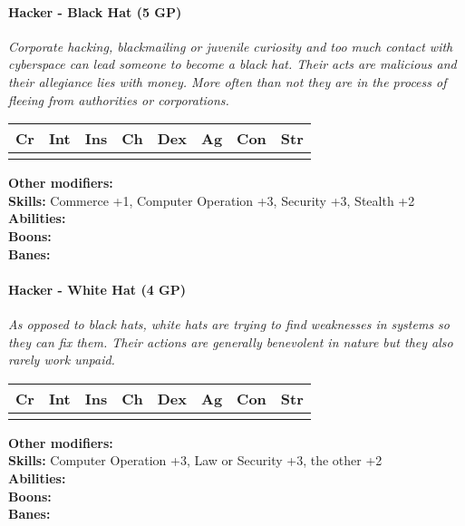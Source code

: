 \hrulefill
\paragraph*{Hacker - Black Hat (5 GP)}
\textit{Corporate hacking, blackmailing or juvenile curiosity and too much contact with cyberspace can lead someone to become a black hat. Their acts are malicious and their allegiance lies with money. More often than not they are in the process of fleeing from authorities or corporations.}\par
\begin{tabular}{|l|l|l|l|l|l|l|l|}
	\hline
	Cr & Int & Ins & Ch & Dex & Ag & Con & Str \\ \hline
	&  &  &  &  &  &  &  \\ \hline
\end{tabular}\par
\noindent\textbf{Other modifiers:} \\
\textbf{Skills:} Commerce +1,
Computer Operation +3,
Security +3,
Stealth +2\\
\textbf{Abilities:} \\
\textbf{Boons:} \\
\textbf{Banes:} \\

\hrulefill
\paragraph*{Hacker - White Hat (4 GP)}
\textit{As opposed to black hats, white hats are trying to find weaknesses in systems so they can fix them. Their actions are generally benevolent in nature but they also rarely work unpaid.}\par
\begin{tabular}{|l|l|l|l|l|l|l|l|}
	\hline
	Cr & Int & Ins & Ch & Dex & Ag & Con & Str \\ \hline
	&  &  &  &  &  &  &  \\ \hline
\end{tabular}\par
\noindent\textbf{Other modifiers:} \\
\textbf{Skills:} Computer Operation +3,
Law or Security +3,
the other +2\\
\textbf{Abilities:} \\
\textbf{Boons:} \\
\textbf{Banes:} \\

\hrulefill

